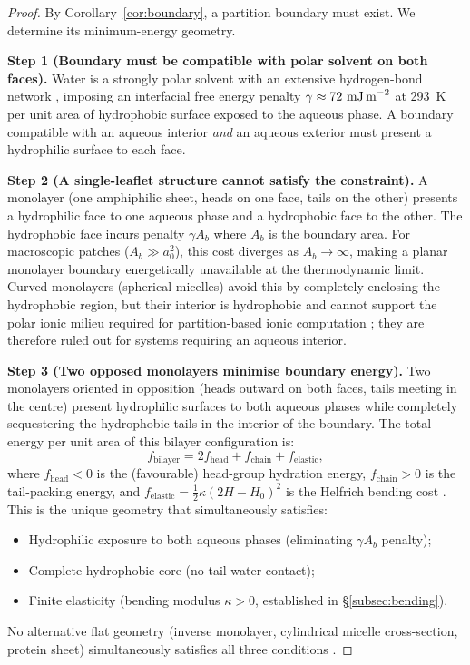 \documentclass[11pt,twocolumn,a4paper]{article}
\theoremstyle{definition}
\theoremstyle{remark}
\begin{document}
\begin{proof}
By Corollary~\ref{cor:boundary}, a partition boundary must exist. We determine
its minimum-energy geometry.

\textbf{Step 1 (Boundary must be compatible with polar solvent on both faces).}
Water is a strongly polar solvent with an extensive hydrogen-bond network
\citep{eisenberg1969}, imposing an interfacial free energy penalty
$\gamma \approx 72\ \text{mJ\,m}^{-2}$ at 293~K per unit area of
hydrophobic surface exposed to the aqueous phase. A boundary compatible with
an aqueous interior \emph{and} an aqueous exterior must present a
hydrophilic surface to each face.

\textbf{Step 2 (A single-leaflet structure cannot satisfy the constraint).}
A monolayer (one amphiphilic sheet, heads on one face, tails on the other)
presents a hydrophilic face to one aqueous phase and a hydrophobic face to
the other. The hydrophobic face incurs penalty $\gamma A_b$ where $A_b$ is the
boundary area. For macroscopic patches ($A_b \gg a_0^2$), this cost
diverges as $A_b \to \infty$, making a planar monolayer boundary
energetically unavailable at the thermodynamic limit. Curved monolayers
(spherical micelles) avoid this by completely enclosing the hydrophobic region,
but their interior is hydrophobic and cannot support the polar ionic milieu
required for partition-based ionic computation \citep{parsegian1974}; they
are therefore ruled out for systems requiring an aqueous interior.

\textbf{Step 3 (Two opposed monolayers minimise boundary energy).}
Two monolayers oriented in opposition (heads outward on both faces, tails
meeting in the centre) present hydrophilic surfaces to both aqueous phases
while completely sequestering the hydrophobic tails in the interior of the
boundary. The total energy per unit area of this bilayer configuration is:
\begin{equation}
f_{\text{bilayer}} = 2f_{\text{head}} + f_{\text{chain}} + f_{\text{elastic}},
\label{eq:bilayer_energy}
\end{equation}
where $f_{\text{head}} < 0$ is the (favourable) head-group hydration energy,
$f_{\text{chain}} > 0$ is the tail-packing energy, and
$f_{\text{elastic}} = \tfrac{1}{2}\kappa(2H-H_0)^2$ is the Helfrich bending
cost \citep{helfrich1973}. This is the unique geometry that simultaneously
satisfies:
\begin{itemize}[nosep]
  \item Hydrophilic exposure to both aqueous phases (eliminating $\gamma A_b$ penalty);
  \item Complete hydrophobic core (no tail-water contact);
  \item Finite elasticity (bending modulus $\kappa > 0$, established
    in \S\ref{subsec:bending}).
\end{itemize}
No alternative flat geometry (inverse monolayer, cylindrical micelle
cross-section, protein sheet) simultaneously satisfies all three conditions
\citep{israelachvili1991}.


\end{proof}
\end{document}
